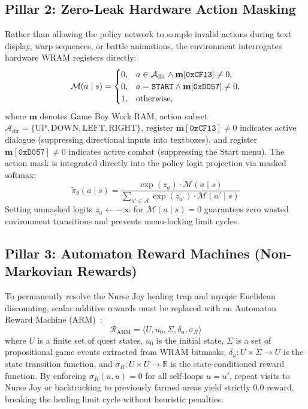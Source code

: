 \documentclass[conference]{IEEEtran}
\begin{document}
\subsection{Pillar 2: Zero-Leak Hardware Action Masking}
Rather than allowing the policy network to sample invalid actions during text display, warp sequences, or battle animations, the environment interrogates hardware WRAM registers directly:
\begin{equation}
\label{eq:action_mask}
\mathcal{M}(a \mid s) = \begin{cases}
0, & a \in \mathcal{A}_{\text{dir}} \wedge \mathbf{m}[\texttt{0xCF13}] \neq 0, \\
0, & a = \text{\texttt{START}} \wedge \mathbf{m}[\texttt{0xD057}] \neq 0, \\
1, & \text{otherwise,}
\end{cases}
\end{equation}
where $\mathbf{m}$ denotes Game Boy Work RAM, action subset $\mathcal{A}_{\text{dir}} = \{\text{UP}, \text{DOWN}, \text{LEFT}, \text{RIGHT}\}$, register $\mathbf{m}[\texttt{0xCF13}] \ne 0$ indicates active dialogue (suppressing directional inputs into textboxes), and register $\mathbf{m}[\texttt{0xD057}] \ne 0$ indicates active combat (suppressing the Start menu). The action mask is integrated directly into the policy logit projection via masked softmax:
\begin{equation}
\tilde{\pi}_\theta(a \mid s) = \frac{\exp(z_a) \cdot \mathcal{M}(a \mid s)}{\sum_{a' \in \mathcal{A}} \exp(z_{a'}) \cdot \mathcal{M}(a' \mid s)}
\end{equation}
Setting unmasked logits $z_a \leftarrow -\infty$ for $\mathcal{M}(a \mid s) = 0$ guarantees zero wasted environment transitions and prevents menu-locking limit cycles.

\subsection{Pillar 3: Automaton Reward Machines (Non-Markovian Rewards)}
To permanently resolve the Nurse Joy healing trap and myopic Euclidean discounting, scalar additive rewards must be replaced with an Automaton Reward Machine (ARM)~\cite{icarte2022reward}:
\begin{equation}
\mathcal{R}_{\text{ARM}} = \langle U, u_0, \Sigma, \delta_u, \sigma_R \rangle
\end{equation}
where $U$ is a finite set of quest states, $u_0$ is the initial state, $\Sigma$ is a set of propositional game events extracted from WRAM bitmasks, $\delta_u: U \times \Sigma \to U$ is the state transition function, and $\sigma_R: U \times U \to \mathbb{R}$ is the state-conditioned reward function. By enforcing $\sigma_R(u, u) = 0$ for all self-loops $u = u'$, repeat visits to Nurse Joy or backtracking to previously farmed areas yield strictly $0.0$ reward, breaking the healing limit cycle without heuristic penalties.
\end{document}
